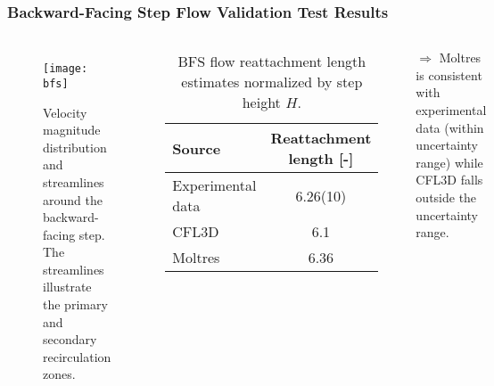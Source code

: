 
\begin{frame}
  \frametitle{Backward-Facing Step Flow Validation Test Results}
  \begin{columns}
    \column{5.5cm}
    \begin{figure}[htb!]
      \centering
      \texttt{[image: bfs]}
      \caption{Velocity magnitude distribution and streamlines around the backward-facing step. The
      streamlines illustrate the primary and secondary recirculation zones.}
      \label{fig:bfs}
    \end{figure}
    \column{5.5cm}
    \begin{table}[htb]
      \centering
      \scriptsize
      \caption{BFS flow reattachment length estimates normalized by step height $H$.}
      \begin{tabular}{l S[table-format=1.2(2)]}
        \toprule
        Source & {Reattachment length [-]} \\
        \midrule
        Experimental data & 6.26(10) \\
        CFL3D & 6.1 \\
        Moltres & 6.36 \\
        \bottomrule
      \end{tabular}
      \label{table:bfs-reattach}
    \end{table}
    \vspace{.1cm}

    $\Rightarrow$ Moltres is consistent with experimental data (within uncertainty range) while CFL3D
    falls outside the uncertainty range.
  \end{columns}
\end{frame}

